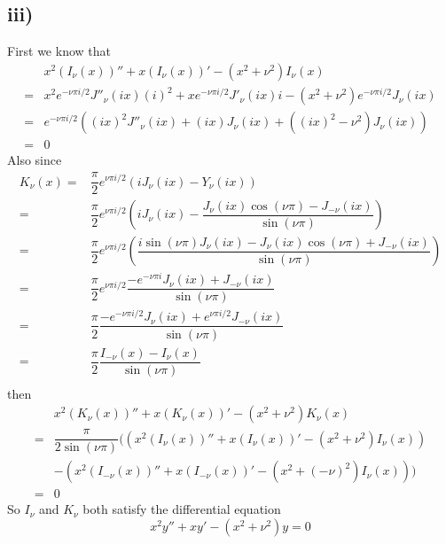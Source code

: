 \documentclass[a4paper,12pt,titlepage]{article}
\begin{document}
\subsection*{iii)}
First we know that
\begin{align*}
&x^2(I_{\nu}(x))''+x(I_{\nu}(x))'-(x^2+\nu^2)I_{\nu}(x)\\
=&x^2e^{-\nu\pi i/2}J''_{\nu}(ix)(i)^2+xe^{-\nu \pi i/2}J'_{\nu}(ix)i-(x^2+\nu^2)e^{-\nu\pi i/2}J_{\nu}(ix)\\
=&e^{-\nu\pi i/2}((ix)^2J''_{\nu}(ix)+(ix)J_{\nu}(ix)+((ix)^2-\nu^2)J_{\nu}(ix))\\
=&0
\end{align*}
Also since
\begin{align*}
K_{\nu}(x)=&\dfrac{\pi}{2}e^{\nu \pi i/2}(iJ_{\nu}(ix)-Y_{\nu}(ix))\\
=&\dfrac{\pi}{2}e^{\nu \pi i/2}(iJ_{\nu}(ix)-\dfrac{J_{\nu}(ix)\cos(\nu\pi)-J_{-\nu}(ix)}{\sin(\nu \pi)})\\
=&\dfrac{\pi}{2}e^{\nu \pi i/2}(\dfrac{i\sin(\nu \pi)J_{\nu}(ix)-J_{\nu}(ix)\cos(\nu\pi)+J_{-\nu}(ix)}{\sin(\nu \pi)})\\
=&\dfrac{\pi}{2}e^{\nu \pi i/2}\dfrac{-e^{-\nu\pi i}J_{\nu}(ix)+J_{-\nu}(ix)}{\sin(\nu \pi)}\\
=&\dfrac{\pi}{2}\dfrac{-e^{-\nu\pi i/2}J_{\nu}(ix)+e^{\nu \pi i/2}J_{-\nu}(ix)}{\sin(\nu \pi)}\\
=&\dfrac{\pi}{2}\dfrac{I_{-\nu}(x)-I_{\nu}(x)}{\sin(\nu \pi)}\\
\end{align*}
then
\begin{align*}
&x^2(K_{\nu}(x))''+x(K_{\nu}(x))'-(x^2+\nu^2)K_{\nu}(x)\\
=&\dfrac{\pi}{2\sin(\nu \pi)}((x^2(I_{\nu}(x))''+x(I_{\nu}(x))'-(x^2+\nu^2)I_{\nu}(x))\\
&-(x^2(I_{-\nu}(x))''+x(I_{-\nu}(x))'-(x^2+(-\nu)^2)I_{\nu}(x)))\\
=&0
\end{align*}
So $I_{\nu}$ and $K_{\nu}$ both satisfy the differential equation
$$x^2y''+xy'-(x^2+\nu^2)y=0$$
\end{document}
